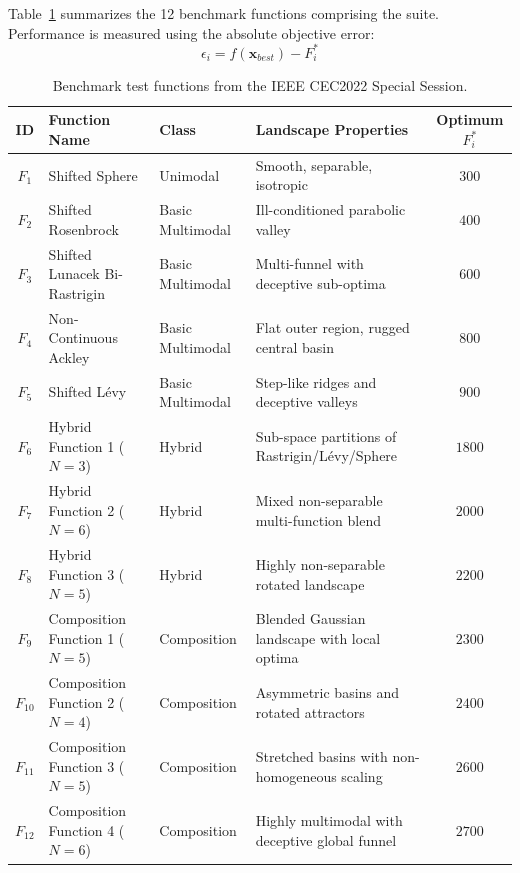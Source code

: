 Table~\ref{tab:cec2022_suite} summarizes the 12 benchmark functions comprising the suite. Performance is measured using the absolute objective error:
\begin{equation}
\epsilon_i = f(\mathbf{x}_{best}) - F_i^*
\label{eq:error_metric}
\end{equation}

\begin{table}[htbp]
\centering
\caption{Benchmark test functions from the IEEE CEC2022 Special Session.}
\label{tab:cec2022_suite}
\begin{tabular}{cllp{5.5cm}c}
\toprule
\textbf{ID} & \textbf{Function Name} & \textbf{Class} & \textbf{Landscape Properties} & \textbf{Optimum $F_i^*$} \\
\midrule
$F_1$ & Shifted Sphere & Unimodal & Smooth, separable, isotropic & $300$ \\
$F_2$ & Shifted Rosenbrock & Basic Multimodal & Ill-conditioned parabolic valley & $400$ \\
$F_3$ & Shifted Lunacek Bi-Rastrigin & Basic Multimodal & Multi-funnel with deceptive sub-optima & $600$ \\
$F_4$ & Non-Continuous Ackley & Basic Multimodal & Flat outer region, rugged central basin & $800$ \\
$F_5$ & Shifted Lévy & Basic Multimodal & Step-like ridges and deceptive valleys & $900$ \\
$F_6$ & Hybrid Function 1 ($N=3$) & Hybrid & Sub-space partitions of Rastrigin/Lévy/Sphere & $1800$ \\
$F_7$ & Hybrid Function 2 ($N=6$) & Hybrid & Mixed non-separable multi-function blend & $2000$ \\
$F_8$ & Hybrid Function 3 ($N=5$) & Hybrid & Highly non-separable rotated landscape & $2200$ \\
$F_9$ & Composition Function 1 ($N=5$) & Composition & Blended Gaussian landscape with local optima & $2300$ \\
$F_{10}$ & Composition Function 2 ($N=4$) & Composition & Asymmetric basins and rotated attractors & $2400$ \\
$F_{11}$ & Composition Function 3 ($N=5$) & Composition & Stretched basins with non-homogeneous scaling & $2600$ \\
$F_{12}$ & Composition Function 4 ($N=6$) & Composition & Highly multimodal with deceptive global funnel & $2700$ \\
\bottomrule
\end{tabular}
\end{table}

